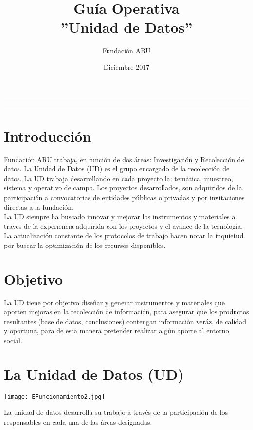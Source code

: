 \documentclass{article}
\title{\textbf{Guía Operativa} \\ ''Unidad de Datos''}
\author{Fundación ARU}
\date{Diciembre 2017}
\begin{document}
\maketitle

\hrule
\hrule
\newpage

\section{Introducción}

Fundación ARU trabaja, en función de dos áreas: Investigación y Recolección de datos. La Unidad de Datos (UD) es el grupo encargado de la recolección de datos. La UD trabaja desarrollando en cada proyecto la: temática, muestreo, sistema y operativo de campo. Los proyectos desarrollados, son adquiridos de la participación a convocatorias de entidades públicas o privadas y por invitaciones directas a la fundación.\\

La UD siempre ha buscado innovar y mejorar los instrumentos y materiales a través de la experiencia adquirida con los proyectos y el avance de la tecnología. La actualización constante de los protocolos de trabajo hacen notar la inquietud por buscar la optimización de los recursos disponibles. 


\section{Objetivo}

La UD tiene por objetivo diseñar y generar instrumentos y materiales que aporten mejoras en la recolección de información, para asegurar que los productos resultantes (base de datos, conclusiones) contengan información veráz, de calidad y oportuna, para de esta manera pretender realizar algún aporte al entorno social.
\section{La Unidad de Datos (UD)}


\begin{center}
\texttt{[image: EFuncionamiento2.jpg]}
\end{center}

La unidad de datos desarrolla su trabajo a través de la participación de los responsables en cada una de las áreas designadas.\\
\end{document}
